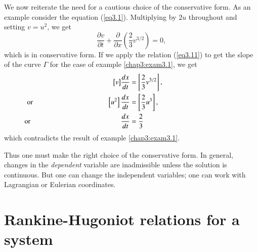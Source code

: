 \begin{remark}\label{chap3:rem3.2}
We now reiterate the need for a cautious choice of the conservative
form. As an example consider the equation (\ref{eq3.1}). Multiplying by $2u$
throughout and setting $v = u^2$, we get
\begin{equation*}
\frac{\partial v}{\partial t} + \frac{\partial}{\partial x}
(\frac{2}{3} v^{3/2}) = 0, \tag{3.13}\label{eq3.13}
\end{equation*}
which is in conservative form. If we apply the relation (\ref{eq3.11}) to get
the slope of the curve $\Gamma$ for the case of example \ref{chap3:exam3.1}, we get
\begin{align*}
\big[v \big] \frac{dx}{dt} & = \left[\frac{2}{3} v^{3/2} \right],\\
\text{or} \hspace{3.7cm} \left[u^2 \right] \frac{dx}{dt} & = \left[\frac{2}{3}
  u^3 \right], \hspace{3.7cm}\\ 
\text{or} \hspace{4.5cm} \frac{dx}{dt} & = \frac{2}{3} \hspace{4.7cm}
\end{align*}
which contradicts the result of example \ref{chap3:exam3.1}.

Thus one must make the right choice of the conservative form. In
general, changes in the {\em dependent} variable are inadmissible
unless the solution is continuous. But one can change the independent
variables; one can work with Lagrangian or Eulerian coordinates. 
\end{remark}

\section{Rankine-Hugoniot relations for a system}\label{chap3:sec3.3}

